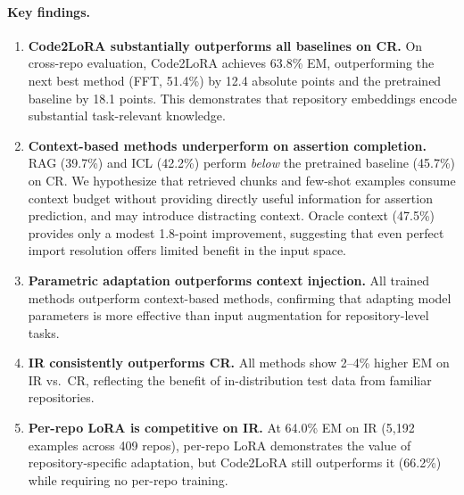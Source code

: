 \documentclass[11pt]{article}
\newcommand{\method}{Code2LoRA}
\begin{document}
\paragraph{Key findings.}
\begin{enumerate}[nosep]
    \item \textbf{\method{} substantially outperforms all baselines on CR.}
    On cross-repo evaluation, \method{} achieves 63.8\% EM, outperforming the next best method (FFT, 51.4\%) by 12.4 absolute points and the pretrained baseline by 18.1 points.
    This demonstrates that repository embeddings encode substantial task-relevant knowledge.

    \item \textbf{Context-based methods underperform on assertion completion.}
    RAG (39.7\%) and ICL (42.2\%) perform \emph{below} the pretrained baseline (45.7\%) on CR.
    We hypothesize that retrieved chunks and few-shot examples consume context budget without providing directly useful information for assertion prediction, and may introduce distracting context.
    Oracle context (47.5\%) provides only a modest 1.8-point improvement, suggesting that even perfect import resolution offers limited benefit in the input space.

    \item \textbf{Parametric adaptation outperforms context injection.}
    All trained methods outperform context-based methods, confirming that adapting model parameters is more effective than input augmentation for repository-level tasks.

    \item \textbf{IR consistently outperforms CR.}
    All methods show 2--4\% higher EM on IR vs.\ CR, reflecting the benefit of in-distribution test data from familiar repositories.

    \item \textbf{Per-repo LoRA is competitive on IR.}
    At 64.0\% EM on IR (5,192 examples across 409 repos), per-repo LoRA demonstrates the value of repository-specific adaptation, but \method{} still outperforms it (66.2\%) while requiring no per-repo training.
\end{enumerate}
\end{document}
